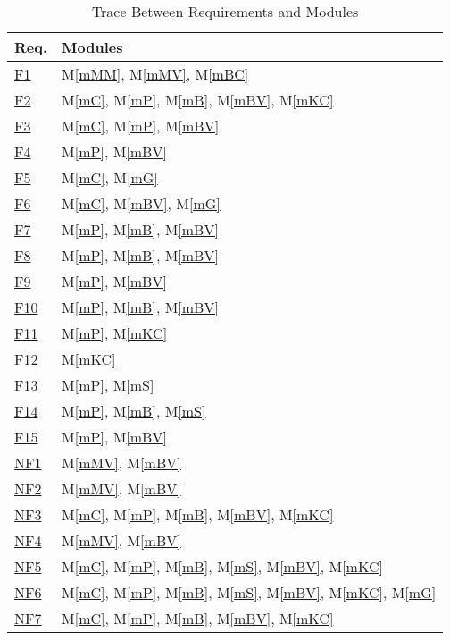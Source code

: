 \documentclass[12pt, titlepage]{article}
\newcommand{\mref}[1]{M\ref{#1}}
\begin{document}
\begin{table}[H]
\centering
\begin{tabular}{p{} p{}}
\toprule
\textbf{Req.} & \textbf{Modules}\\
\midrule
\href{../../SRS/SRS.pdf#f1}{F1} & \mref{mMM}, \mref{mMV}, \mref{mBC}\\
\href{../../SRS/SRS.pdf#f2}{F2} & \mref{mC}, \mref{mP}, \mref{mB}, \mref{mBV}, \mref{mKC}\\
\href{../../SRS/SRS.pdf#f3}{F3} & \mref{mC}, \mref{mP}, \mref{mBV}\\
\href{../../SRS/SRS.pdf#f4}{F4} & \mref{mP}, \mref{mBV}\\
\href{../../SRS/SRS.pdf#f5}{F5} & \mref{mC}, \mref{mG}\\
\href{../../SRS/SRS.pdf#f6}{F6} & \mref{mC}, \mref{mBV}, \mref{mG}\\
\href{../../SRS/SRS.pdf#f7}{F7} & \mref{mP}, \mref{mB}, \mref{mBV}\\
\href{../../SRS/SRS.pdf#f8}{F8} & \mref{mP}, \mref{mB}, \mref{mBV}\\
\href{../../SRS/SRS.pdf#f9}{F9} & \mref{mP}, \mref{mBV}\\
\href{../../SRS/SRS.pdf#f10}{F10} & \mref{mP}, \mref{mB}, \mref{mBV}\\
\href{../../SRS/SRS.pdf#f11}{F11} & \mref{mP}, \mref{mKC}\\
\href{../../SRS/SRS.pdf#f12}{F12} & \mref{mKC}\\
\href{../../SRS/SRS.pdf#f13}{F13} & \mref{mP}, \mref{mS}\\
\href{../../SRS/SRS.pdf#f14}{F14} & \mref{mP}, \mref{mB}, \mref{mS}\\
\href{../../SRS/SRS.pdf#f15}{F15} & \mref{mP}, \mref{mBV}\\
\href{../../SRS/SRS.pdf#nf1}{NF1} & \mref{mMV}, \mref{mBV}\\
\href{../../SRS/SRS.pdf#nf2}{NF2} & \mref{mMV}, \mref{mBV}\\
\href{../../SRS/SRS.pdf#nf3}{NF3} & \mref{mC}, \mref{mP}, \mref{mB}, \mref{mBV}, \mref{mKC}\\
\href{../../SRS/SRS.pdf#nf4}{NF4} & \mref{mMV}, \mref{mBV}\\
\href{../../SRS/SRS.pdf#nf5}{NF5} & \mref{mC}, \mref{mP}, \mref{mB}, \mref{mS}, \mref{mBV}, \mref{mKC}\\
\href{../../SRS/SRS.pdf#nf6}{NF6} & \mref{mC}, \mref{mP}, \mref{mB}, \mref{mS}, \mref{mBV}, \mref{mKC}, \mref{mG}\\
\href{../../SRS/SRS.pdf#nf7}{NF7} & \mref{mC}, \mref{mP}, \mref{mB}, \mref{mBV}, \mref{mKC}\\
\bottomrule
\end{tabular}
\caption{Trace Between Requirements and Modules}
\label{TblRT}
\end{table}
\end{document}

